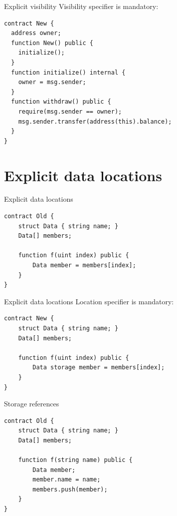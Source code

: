 \documentclass[aspectratio=169,10pt]{beamer}
\begin{document}
\begin{frame}[fragile]{Explicit visibility}
Visibility specifier is mandatory:
  \begin{mdframed}
    \begin{lstlisting}[language=Solidity]
contract New {
  address owner;
  function New() public {
    initialize();
  }
  function initialize() internal {
    owner = msg.sender; 
  }
  function withdraw() public {
    require(msg.sender == owner);
    msg.sender.transfer(address(this).balance);
  }
}
    \end{lstlisting}
  \end{mdframed}
\end{frame}

\section{Explicit data locations}

\begin{frame}[fragile]{Explicit data locations}
\begin{mdframed}
\begin{lstlisting}[language=Solidity]
contract Old {
    struct Data { string name; }
    Data[] members;

    function f(uint index) public {
        Data member = members[index];
    }
}
\end{lstlisting}
\end{mdframed}
\end{frame}

\begin{frame}[fragile]{Explicit data locations}
Location specifier is mandatory:
\begin{mdframed}
\begin{lstlisting}[language=Solidity]
contract New {
    struct Data { string name; }
    Data[] members;

    function f(uint index) public {
        Data storage member = members[index];
    }
}
\end{lstlisting}
\end{mdframed}
\end{frame}

\begin{frame}[fragile]{Storage references}
\begin{mdframed}
\begin{lstlisting}[language=Solidity]
contract Old {
    struct Data { string name; }
    Data[] members;

    function f(string name) public {
        Data member;
        member.name = name;
        members.push(member);
    }
}
\end{lstlisting}
\end{mdframed}
\end{frame}
\end{document}
